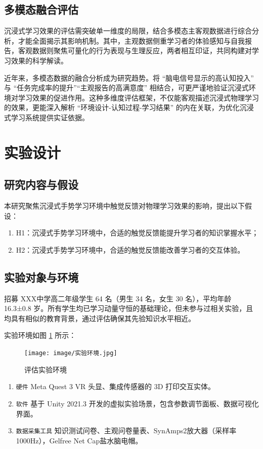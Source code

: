 \documentclass[runningheads]{llncs}
\begin{document}
\subsection{多模态融合评估}
沉浸式学习效果的评估需突破单一维度的局限，结合多模态主客观数据进行综合分析，才能全面揭示其影响机制。其中，主观数据侧重学习者的体验感知与自我报告，客观数据则聚焦可量化的行为表现与生理反应，两者相互印证，共同构建对学习效果的科学解读。

近年来，多模态数据的融合分析成为研究趋势。将 “脑电信号显示的高认知投入” 与 “任务完成率的提升”“主观报告的高满意度” 相结合，可更严谨地验证沉浸式环境对学习效果的促进作用\cite{DUBOVI2022104495}。这种多维度评估框架，不仅能客观描述沉浸式物理学习的效果，更能深入解析 “环境设计-认知过程-学习结果” 的内在关联，为优化沉浸式学习系统提供实证依据。

\section{实验设计}
\subsection{研究内容与假设}
本研究聚焦沉浸式手势学习环境中触觉反馈对物理学习效果的影响，提出以下假设：

\begin{enumerate}[label={$\bullet$}]
  \item H1：沉浸式手势学习环境中，合适的触觉反馈能提升学习者的知识掌握水平；
  \item H2：沉浸式手势学习环境中，合适的触觉反馈能改善学习者的交互体验。
\end{enumerate}

\subsection{实验对象与环境}

招募
XXX中学高二年级学生 64 名（男生 34 名，女生 30 名），平均年龄 16.3±0.8 岁。所有学生均已学习动量守恒的基础理论，但未参与过相关实验，且均具有相似的教育背景，通过评估确保其先验知识水平相近。

实验环境如图
 \ref{fig1}
所示：

\begin{figure}
\texttt{[image: image/实验环境.jpg]}
	\caption{评估实验环境}\label{fig1}
\end{figure}

\begin{enumerate}[label={$\bullet$}]
  \item \texttt{硬件} Meta Quest 3 VR 头显、集成传感器的 3D 打印交互实体。
  \item \texttt{软件} 基于 Unity 2021.3 开发的虚拟实验场景，包含参数调节面板、数据可视化界面。
  \item \texttt{数据采集工具} 知识测试问卷、主观问卷量表、SynAmps2放大器（采样率1000Hz），Gelfree Net Cap盐水脑电帽。
\end{enumerate}
\end{document}

